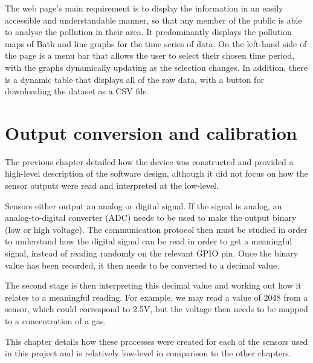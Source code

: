 \documentclass[11pt]{report}
\begin{document}
The web page's main requirement is to display the information in an easily accessible and understandable manner, so that any member of the public is able to analyse the pollution in their area. It predominantly displays the pollution maps of Bath and line graphs for the time series of data. On the left-hand side of the page is a menu bar that allows the user to select their chosen time period, with the graphs dynamically updating as the selection changes. In addition, there is a dynamic table that displays all of the raw data, with a button for downloading the dataset as a CSV file.



\chapter{Output conversion and calibration} \label{chap: calibration}

The previous chapter detailed how the device was constructed and provided a high-level description of the software design, although it did not focus on how the sensor outputs were read and interpreted at the low-level.

Sensors either output an analog or digital signal. If the signal is analog, an analog-to-digital converter (ADC) needs to be used to make the output binary (low or high voltage). The communication protocol then must be studied in order to understand how the digital signal can be read in order to get a meaningful signal, instead of reading randomly on the relevant GPIO pin. Once the binary value has been recorded, it then needs to be converted to a decimal value.

The second stage is then interpreting this decimal value and working out how it relates to a meaningful reading. For example, we may read a value of 2048 from a sensor, which could correspond to 2.5V, but the voltage then needs to be mapped to a concentration of a gas.

This chapter details how these processes were created for each of the sensors used in this project and is relatively low-level in comparison to the other chapters.
\end{document}
